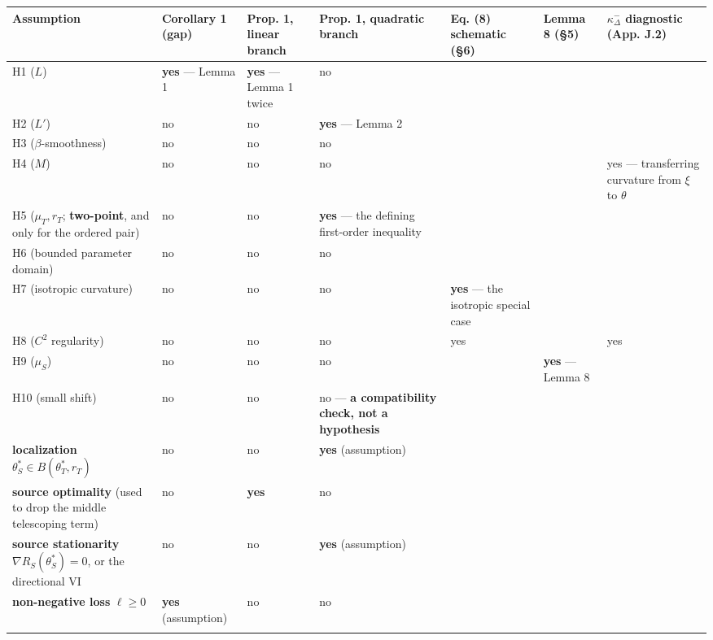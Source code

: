\documentclass[pdflatex,sn-mathphys-ay]{sn-jnl}
\begin{document}
{\footnotesize
\setlength{\tabcolsep}{4pt}
\begin{longtable}{p{}p{}p{}p{}p{}p{}p{}}
\toprule
Assumption & Corollary 1 (gap) & Prop. 1, linear branch & Prop. 1, quadratic branch & Eq. (8) schematic (\S{}6) & Lemma 8 (\S{}5) & $\kappa^-_\Delta$ diagnostic (App. J.2) \\
\midrule
\endhead
H1 ($L$) & \textbf{yes} --- Lemma 1 & \textbf{yes} --- Lemma 1 twice & no &  &  &  \\
H2 ($L'$) & no & no & \textbf{yes} --- Lemma 2 &  &  &  \\
H3 ($\beta$-smoothness) & no & no & no &  &  &  \\
H4 ($M$) & no & no & no &  &  & yes --- transferring curvature from $\xi$ to $\theta$ \\
H5 ($\mu_T,r_T$; \textbf{two-point}, and only for the ordered pair) & no & no & \textbf{yes} --- the defining first-order inequality &  &  &  \\
H6 (bounded parameter domain) & no & no & no &  &  &  \\
H7 (isotropic curvature) & no & no & no & \textbf{yes} --- the isotropic special case &  &  \\
H8 ($C^2$ regularity) & no & no & no & yes &  & yes \\
H9 ($\mu_S$) & no & no & no &  & \textbf{yes} --- Lemma 8 &  \\
H10 (small shift) & no & no & no --- \textbf{a compatibility check, not a hypothesis} &  &  &  \\
\textbf{localization} $\theta^*_S\in B(\theta^*_T,r_T)$ & no & no & \textbf{yes} (assumption) &  &  &  \\
\textbf{source optimality} (used to drop the middle telescoping term) & no & \textbf{yes} & no &  &  &  \\
\textbf{source stationarity} $\nabla R_S(\theta^*_S)=0$, or the directional VI & no & no & \textbf{yes} (assumption) &  &  &  \\
\textbf{non-negative loss} $\ell\ge0$ & \textbf{yes} (assumption) & no & no &  &  &  \\
\botrule
\end{longtable}}
\end{document}
